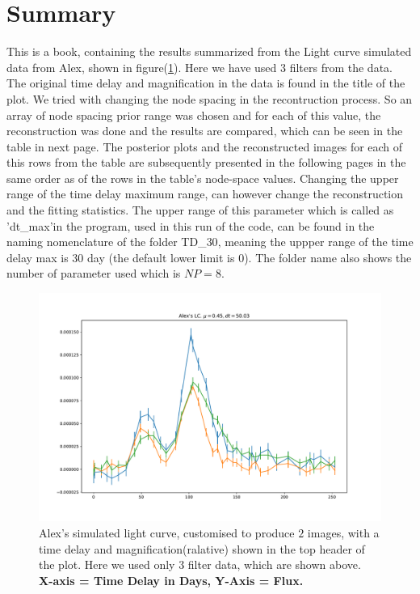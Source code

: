 \documentclass{article}
\begin{document}
\section*{Summary}
This is a book, containing the results summarized from the Light curve simulated data from Alex, shown in figure(\ref{A}). Here we have used $3$ filters from the data. The original time delay and magnification in the data is found in the title of the plot. We tried with changing the node spacing in the recontruction process. So an array of node spacing prior range was chosen and for each of this value, the reconstruction was done and the results are compared, which can be seen in the table in next page. The posterior plots and the reconstructed images for each of this rows from the table are subsequently presented in the following pages in the same order as of the rows in the table's node-space values.
Changing the upper range of the time delay maximum range, can however change the reconstruction and the fitting statistics. The upper range of this parameter which is called as 'dt\_max'in the program, used in this run of the code, can be found in the naming nomenclature of the folder TD\_$30$, meaning the uppper range of the time delay max is $30$ day (the default lower limit is $0$). The folder name also shows the number of parameter used which is $NP=8$. 
  

\begin{figure}[h!]
  \centering
    \includegraphics[width=\textwidth]{Alex_LC.pdf}
  \caption{Alex's simulated light curve, customised to produce $2$ images, with a time delay and magnification(ralative) shown in the top header of the plot. Here we used only $3$ filter data, which are shown above.\\\hspace{\textwidth}\textbf{X-axis = Time Delay in Days, Y-Axis = Flux.}}
  \label{A}
\end{figure}
\end{document}
